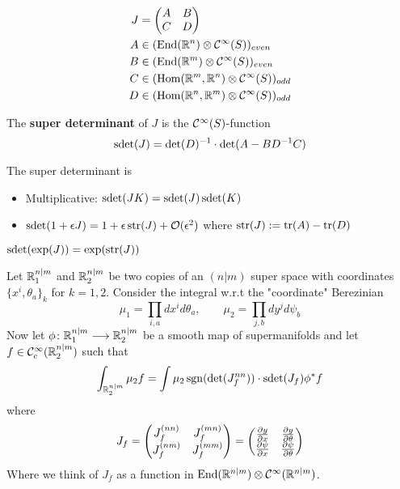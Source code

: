 \begin{rem}
  \begin{align*}
  J &=
  \begin{pmatrix}
    A & B \\
    C & D
  \end{pmatrix} \\
  A &\in (\operatorname{End}(\mathbb{R}^n) \otimes \mathcal{C}^{\infty}(S))_{even} \\
  B &\in (\operatorname{End}(\mathbb{R}^m) \otimes \mathcal{C}^{\infty}(S))_{even} \\
  C &\in (\operatorname{Hom}(\mathbb{R}^m, \mathbb{R}^n) \otimes \mathcal{C}^{\infty}(S))_{odd} \\
  D &\in (\operatorname{Hom}(\mathbb{R}^n, \mathbb{R}^m) \otimes \mathcal{C}^{\infty}(S))_{odd}
  \end{align*}

  \begin{definition}
    The \textbf{super determinant} of $J$ is the $\mathcal{C}^{\infty}(S)$-function
    $$ \operatorname{sdet}(J) = \det(D)^{-1} \cdot \det(A-BD^{-1} C) $$
  \end{definition}

  \begin{lem}
    The super determinant is
    \begin{itemize}
      \item Multiplicative: $\operatorname{sdet}(JK) = \operatorname{sdet}(J) \operatorname{sdet}(K)$
      \item $\sdet(1 + \epsilon J) = 1 + \epsilon \str(J)+ \OO(\epsilon^2)$ where $\operatorname{str}(J) := \operatorname{tr}(A) - \operatorname{tr}(D)$
    \end{itemize}
  \end{lem}

  \begin{corollary}
    $\operatorname{sdet}(\exp(J)) = \exp(\operatorname{str}(J))$
  \end{corollary}

  \begin{theo}
    Let $\mathbb{R}^{n|m}_1$ and $\mathbb{R}^{n|m}_2$ be two copies of an $(n|m)$ super space with coordinates $\{x^i, \theta_a\}_k$ for $k = 1,2$. Consider the integral w.r.t the "coordinate" Berezinian
    $$ \mu_1 = \prod_{i,a} dx^i d\theta_a, \quad \quad \mu_2 = \prod_{j,b} dy^j d\psi_b$$
    Now let $\phi \colon \RR^{n|m}_1 \lra \RR^{n|m}_2$ be a smooth map of supermanifolds and let $f \in \mathcal{C}^{\infty}_c(\mathbb{R}^{n|m}_2)$ such that
    $$ \int_{\RR^{n|m}_2} \mu_2 f = \int \mu_2 \sgn(\det(J_f^{nn})) \cdot \sdet(J_f) \phi^* f $$
    where
    \begin{align*}
    J_f =
    \begin{pmatrix}
      J_f^{(nn)} & J_f^{(mn)} \\
      J_f^{(nm)} & J_f^{(mm)}
    \end{pmatrix} =
    \begin{pmatrix}
      \frac{\partial y}{\partial x} & \frac{\partial y}{\partial \theta} \\
      \frac{\partial \psi}{\partial x} & \frac{\partial \psi}{\partial \theta}
    \end{pmatrix}
    \end{align*}
    Where we think of $J_f$ as a function in $\operatorname{End}(\mathbb{R}^{n|m}) \otimes \mathcal{C}^{\infty}(\mathbb{R}^{n|m})$.
  \end{theo}


\end{rem}

